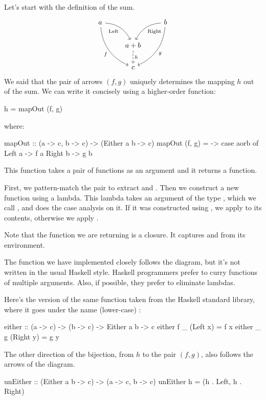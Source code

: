 \documentclass[DaoFP]{subfiles}
\begin{document}
Let's start with the definition of the sum.
\[
 \begin{tikzcd}
 a
 \arrow[dr,  bend left, "\text{Left}"']
 \arrow[ddr, bend right, "f"']
 && b
 \arrow[dl, bend right, "\text{Right}"]
 \arrow[ddl, bend left, "g"]
 \\
&a + b
\arrow[d, dashed, "h"]
\\
& c
 \end{tikzcd}
\]
We said that the pair of arrows $(f, g)$ uniquely determines the mapping $h$ out of the sum. We can write it concisely using a higher-order function:
\begin{haskell}
h = mapOut (f, g)
\end{haskell}
where:
\begin{haskell}
mapOut :: (a -> c, b -> c) -> (Either a b -> c)
mapOut (f, g) = \aorb -> case aorb of
                         Left  a -> f a
                         Right b -> g b
\end{haskell}
This function takes a pair of functions as an argument and it returns a function. 

First, we pattern-match the pair  to extract  and . Then we construct a new function using a lambda. This lambda takes an argument of the type , which we call , and does the case analysis on it. If it was constructed using , we apply  to its contents, otherwise we apply . 

Note that the function we are returning is a closure. It captures  and  from its environment. 

The function we have implemented closely follows the diagram, but it's not written in the usual Haskell style. Haskell programmers prefer to curry functions of multiple arguments. Also, if possible, they prefer to eliminate lambdas. 

Here's the version of the same function taken from the Haskell standard library, where it goes under the name (lower-case) :
\begin{haskell}
either :: (a -> c) -> (b -> c) -> Either a b -> c
either f _ (Left x)     =  f x
either _ g (Right y)    =  g y
\end{haskell}

The other direction of the bijection, from $h$ to the pair $(f, g)$, also follows the arrows of the diagram.
\begin{haskell}
unEither :: (Either a b -> c) -> (a -> c, b -> c)
unEither h = (h . Left, h . Right)
\end{haskell}
\end{document}
